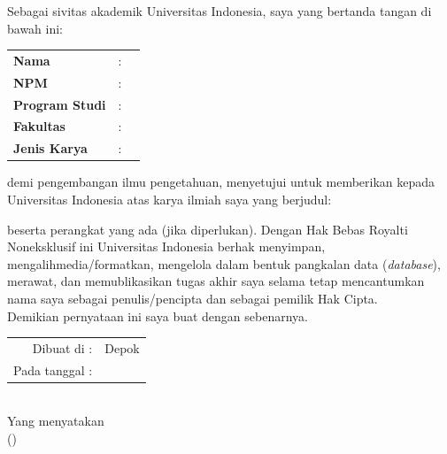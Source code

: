 % 
% 



\vspace*{0.2cm}
\noindent 
Sebagai sivitas akademik Universitas Indonesia, saya yang bertanda 
tangan di bawah ini:
\vspace*{0.4cm}


\begin{tabular}{p{4.2cm} l p{6cm}}
	\textbf{Nama} & : & \penulis \\ 	
	\textbf{NPM} & : & \npm \\
	\textbf{Program Studi} & : & \program\\	
	\textbf{Fakultas} & : & \fakultas\\
	\textbf{Jenis Karya} & : & \type \\
\end{tabular}

\vspace*{0.6cm}
\noindent demi pengembangan ilmu pengetahuan, menyetujui untuk memberikan 
kepada Universitas Indonesia  atas karya ilmiah saya yang berjudul:
\begin{center}
	\judul
\end{center}
beserta perangkat yang ada (jika diperlukan). Dengan Hak Bebas Royalti 
Noneksklusif ini Universitas Indonesia berhak menyimpan, 
mengalihmedia/formatkan, mengelola dalam bentuk pangkalan data 
(\textit{database}), merawat, dan memublikasikan tugas akhir saya selama 
tetap mencantumkan nama saya sebagai penulis/pencipta dan sebagai 
pemilik Hak Cipta. \\

\noindent Demikian pernyataan ini saya buat dengan sebenarnya.

\begin{center}
	\vspace*{0.8cm}
	\begin{tabular}{rl}
		Dibuat di : & Depok \\
		Pada tanggal : & \tanggalPengesahan \\
	\end{tabular}\\

	\vspace*{0.2cm}
	Yang menyatakan \\
	\vspace*{1.1cm}
	(\penulis)
\end{center}

\newpage

